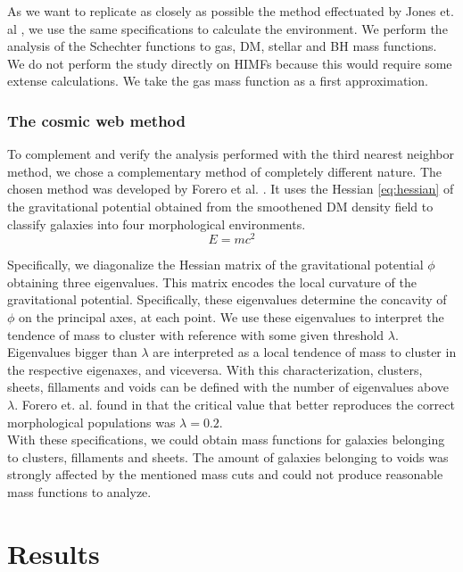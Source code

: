 \documentclass[a4paper,fleqn,usenatbib]{mnras}
\begin{document}
As we want to replicate as closely as possible the method effectuated by Jones et. al \cite{Jones2016}, we use the same specifications to calculate the environment.
We perform the analysis of the Schechter functions to gas, DM, stellar and BH mass functions.
We do not perform the study directly on HIMFs because this would require some extense calculations. We take the gas mass function as a first approximation.\\

\subsubsection{The cosmic web method}
To complement and verify the analysis performed with the third nearest neighbor method, we chose a complementary method of completely different nature. 
The chosen method was developed by Forero et al. \cite{Forero2009}. 
It uses the Hessian \ref{eq:hessian} of the gravitational potential obtained from the smoothened DM density field to classify galaxies into four morphological environments.\\  

\begin{equation}
E =  mc^2
\label{eq:hessian}
\end{equation}

Specifically, we diagonalize the Hessian matrix of the gravitational potential $\phi$ obtaining three eigenvalues. 
This matrix encodes the local curvature of the gravitational potential. 
Specifically, these eigenvalues determine the concavity of $\phi$ on the principal axes, at each point. 
We use these eigenvalues to interpret the tendence of mass to cluster with reference with some given threshold $\lambda$. 
Eigenvalues bigger than $\lambda$ are interpreted as a local tendence of mass to cluster in the respective eigenaxes, and viceversa. 
With this characterization, clusters, sheets, fillaments and voids can be defined with the number of eigenvalues above $\lambda$.
Forero et. al. found in \cite{Forero2009} that the critical value that better reproduces the correct morphological populations was $\lambda = 0.2$. \\

With these specifications, we could obtain mass functions for galaxies belonging to clusters, fillaments and sheets. The amount of galaxies belonging to voids was strongly affected by the mentioned mass cuts and could not produce reasonable mass functions to analyze.

\section{Results}
\end{document}
